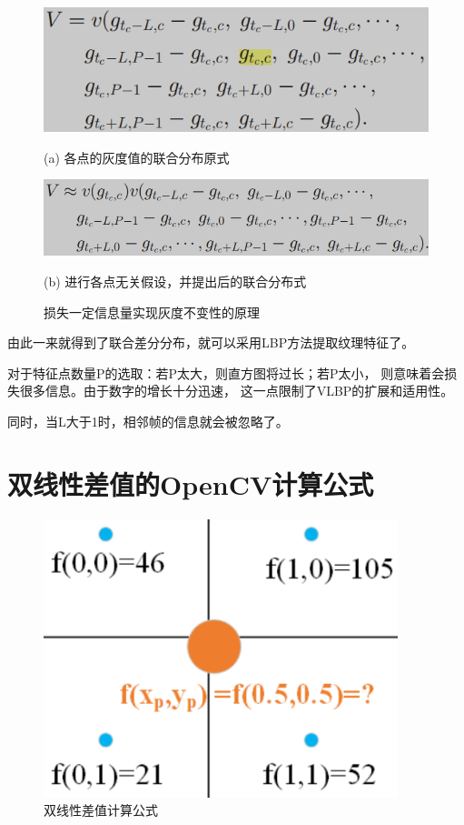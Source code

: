 \documentclass[AutoFakeBold]{MyFormat}
\begin{document}
\begin{figure}[!h]
    \begin{minipage}[t]{0.4\linewidth}
        \centering
        \includegraphics[width=\textwidth]{figures/2022.05.24/gongshi1.png}
        \centerline{(a) 各点的灰度值的联合分布原式}
    \end{minipage}%
    \hspace{0.1\linewidth}
    \begin{minipage}[t]{0.4\linewidth}
        \centering
        \includegraphics[width=\textwidth]{figures/2022.05.24/gongshi2.png}
        \centerline{(b) 进行各点无关假设，并提出后的联合分布式}
    \end{minipage}
    \caption{损失一定信息量实现灰度不变性的原理}
\end{figure}

\par 由此一来就得到了联合差分分布，就可以采用LBP方法提取纹理特征了。
\par 对于特征点数量P的选取：若P太大，则直方图将过长；若P太小，
则意味着会损失很多信息。由于数字的增长十分迅速，
这一点限制了VLBP的扩展和适用性。
\par 同时，当L大于1时，相邻帧的信息就会被忽略了。

\section{双线性差值的OpenCV计算公式}

\begin{figure}[!h]
    \centering
    \includegraphics[width=0.6\linewidth]{figures/2022.05.24/pic12.png}
    \caption{双线性差值计算公式}
\end{figure}
\end{document}
